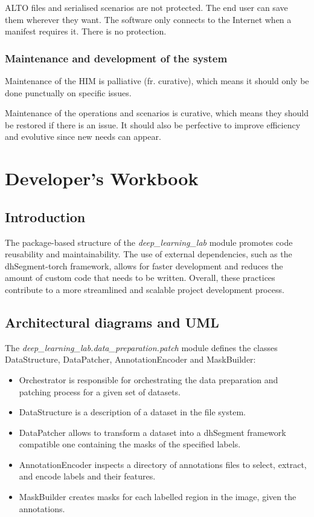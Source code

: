 \documentclass{polytech/polytech}
\numberwithin{figure}{chapter}
\begin{document}
\begin{appendix}
ALTO files and serialised scenarios are not protected. The end user can save them wherever they want.
The software only connects to the Internet when a manifest requires it. There is no protection.


\subsection{Maintenance and development of the system}

Maintenance of the HIM is palliative (fr. curative), which means it should only be done punctually on specific issues.

Maintenance of the operations and scenarios is curative, which means they should be restored if there is an issue. It should also be perfective to improve efficiency and evolutive since new needs can appear.



\chapter{Developer's Workbook}

\section{Introduction}

The package-based structure of the {\it deep_learning_lab} module promotes code reusability and maintainability. The use of external dependencies, such as the dhSegment-torch framework, allows for faster development and reduces the amount of custom code that needs to be written. Overall, these practices contribute to a more streamlined and scalable project development process.

\section{Architectural diagrams and UML}

The {\it deep_learning_lab.data_preparation.patch} module defines the classes DataStructure, DataPatcher, AnnotationEncoder and MaskBuilder:
\begin{itemize}
\item Orchestrator is responsible for orchestrating the data preparation and patching process for a given set of datasets.
\item DataStructure is a description of a dataset in the file system.
\item DataPatcher allows to transform a dataset into a dhSegment framework compatible one containing the masks of the specified labels.
\item AnnotationEncoder inspects a directory of annotations files to select, extract, and encode labels and their features.
\item MaskBuilder creates masks for each labelled region in the image, given the annotations.
\end{itemize}


\end{appendix}
\end{document}
